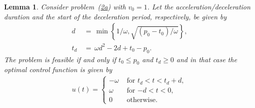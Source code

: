 \documentclass[a4paper]{article}
\theoremstyle{definition}
\theoremstyle{plain}
\newtheorem{lemma}{Lemma}
\begin{document}
\begin{lemma}
  \label{lemma1}
  Consider problem~{\normalfont (\hyperref[eq:setting]{2a})} with $v_{0} = 1$.
  Let the acceleration/deceleration duration and the start of the deceleration
  period, respectively, be given by
  \begin{align*}
  d \;&= \, \min\left\{ 1 / \omega, \sqrt{(p_{0} - t_{0}) / \omega} \right\} , \\
  t_{d}\, &= \, \omega d^{2} - 2d + t_{0} -p_{0} .
  \end{align*}
  The problem is feasible if and only if $t_{0} \leq p_{0}$ and $t_{d} \geq 0$ and in
  that case the optimal control function is given by
  \begin{align*}
    u(t) = \begin{cases}
             -\omega & \text{ for } t_{d} < t < t_{d} + d ,\\
             \omega & \text{ for } {-d} < t < 0 , \\
             0 & \text{ otherwise. }
           \end{cases}
  \end{align*}
\end{lemma}
\end{document}
